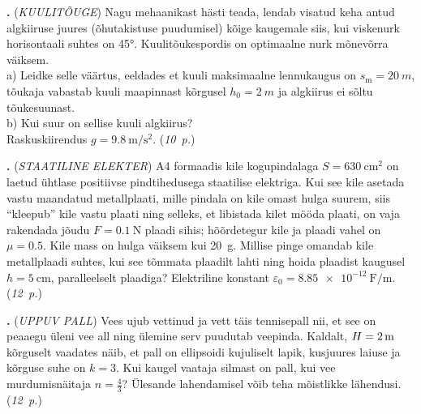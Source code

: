 \documentclass[11pt,a5paper]{article}
\newcommand{\numb}[1]{\vspace{5pt}\textbf{\large #1}}
\newcommand{\nimi}[1]{(\textsl{\small \uppercase{#1}})}
\newcommand{\punktid}[1]{(\emph{#1~p.})}
\newcounter{ylesanne}
\newcommand{\yl}[1]{\addtocounter{ylesanne}{1}\numb{\theylesanne.} \nimi{#1} \newblock{}}
\newcommand{\autor}[1]{}%
\begin{document}
\yl{Kuulitõuge}
Nagu mehaanikast hästi teada, lendab visatud keha antud algkiiruse juures (õhutakistuse puudumisel) kõige kaugemale siis, kui viskenurk horisontaali suhtes on \ang{45}. Kuulitõukespordis on optimaalne nurk mõnevõrra väiksem.
\\a) Leidke selle väärtus, eeldades et kuuli maksimaalne lennukaugus on $s_\text{m}=\SI{20}{m}$, tõukaja vabastab kuuli maapinnast kõrgusel $h_0=\SI{2}{m}$ ja algkiirus ei sõltu tõukesuunast.
\\b) Kui suur on sellise kuuli algkiirus?
\\Raskuskiirendus $g=\SI{9.8}{\meter\per\second\squared}$.
\punktid{10} \autor{Valter Kiisk}

\yl{Staatiline elekter}
A4 formaadis kile kogupindalaga $S= \SI{630}{\square\cm}$ on laetud ühtlase positiivse pindtihedusega staatilise elektriga. Kui see kile asetada vastu  maandatud metallplaati, mille pindala on kile omast hulga suurem, siis \enquote{kleepub} kile vastu plaati ning selleks, et libistada kilet mööda plaati, on vaja rakendada jõudu $F=\SI{0.1}{\N}$ plaadi sihis; hõõrdetegur kile ja plaadi vahel on $\mu=\num{0.5}$. Kile mass on hulga väiksem kui \SI{20}{\g}. Millise pinge omandab kile metallplaadi suhtes, kui see tõmmata plaadilt lahti ning hoida plaadist kaugusel $h=\SI{5}{\cm}$, paralleelselt plaadiga? Elektriline konstant $\varepsilon_0=\SI{8.85e-12}{\F\per\m}$.
\punktid{12} \autor{Jaan Kalda}

\yl{Uppuv pall}
Vees ujub vettinud ja vett täis tennisepall nii, et see on peaaegu üleni vee all ning ülemine serv puudutab veepinda. Kaldalt, $H=\SI 2\m$ kõrguselt vaadates näib, et pall on ellipsoidi kujuliselt lapik, kusjuures laiuse ja kõrguse suhe on $k=3$. Kui kaugel vaataja silmast on pall, kui vee murdumisnäitaja $n=\frac 43$? Ülesande lahendamisel võib teha mõistlikke lähendusi.
\punktid{12} \autor{Jaan Kalda}
\end{document}
